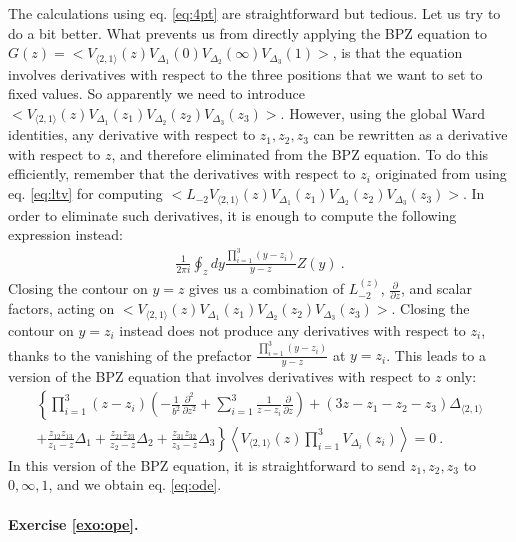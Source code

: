 \documentclass[12pt, a4paper]{article}
\theoremstyle{break}
\begin{document}
The calculations using eq. \eqref{eq:4pt} are straightforward but tedious. Let us try to do a bit better. What prevents us from directly applying the BPZ equation to $G(z)=\Big< V_{\langle 2, 1 \rangle}(z) V_{\Delta_1}(0)V_{\Delta_2}(\infty)V_{\Delta_3}(1) \Big>$, is that the equation involves derivatives with respect to the three positions that we want to set to fixed values. So apparently we need to introduce $\Big< V_{\langle 2, 1 \rangle}(z) V_{\Delta_1}(z_1)V_{\Delta_2}(z_2)V_{\Delta_3}(z_3) \Big>$. 
However, using the global Ward identities, any derivative with respect to $z_1,z_2,z_3$ can be rewritten as a derivative with respect to $z$, and therefore eliminated from the BPZ equation. To do this efficiently, remember that the derivatives with respect to $z_i$ originated from using eq. \eqref{eq:ltv} for computing $\Big< L_{-2}V_{\langle 2, 1 \rangle}(z) V_{\Delta_1}(z_1)V_{\Delta_2}(z_2)V_{\Delta_3}(z_3) \Big>$. In order to eliminate such derivatives, it is enough to compute the following expression instead:
\begin{align}
 \frac{1}{2\pi i}\oint_{z} dy\frac{\prod_{i=1}^3(y-z_i)}{y-z} Z(y) \ .
\end{align}
Closing the contour on $y=z$ gives us a combination of $L_{-2}^{(z)}$, $\frac{\partial}{\partial z}$, and scalar factors, acting on  $\Big< V_{\langle 2, 1 \rangle}(z) V_{\Delta_1}(z_1)V_{\Delta_2}(z_2)V_{\Delta_3}(z_3) \Big>$. Closing the contour on $y=z_i$ instead does not produce any derivatives with respect to $z_i$, thanks to the vanishing of the prefactor $\frac{\prod_{i=1}^3(y-z_i)}{y-z}$ at $y=z_i$. This leads to a version of the BPZ equation that involves derivatives with respect to $z$ only:
\begin{multline}
  \left\{ \prod_{i=1}^3(z-z_i)\left(-\frac{1}{b^2}\frac{\partial^2}{\partial z^2} +\sum_{i=1}^3 \frac{1}{z-z_i} {\frac{\partial}{\partial z}} \right) + (3z-z_1-z_2-z_3)\Delta_{\langle 2,1 \rangle} \right.
  \\
\left.  +\frac{z_{12}z_{13}}{z_1-z}\Delta_1 + \frac{z_{21}z_{23}}{z_2-z}\Delta_2+\frac{z_{31}z_{32}}{z_3-z}\Delta_3\right\} 
\left\langle V_{\langle 2,1 \rangle}(z)\prod_{i=1}^3 V_{\Delta_i}(z_i)\right\rangle  = 0\ .
\label{uode}
\end{multline}
In this version of the BPZ equation, it is straightforward to send $z_1,z_2,z_3$ to $0,\infty, 1$, and we obtain eq. \eqref{eq:ode}.


\paragraph{Exercise \ref{exo:ope}.}
\end{document}
